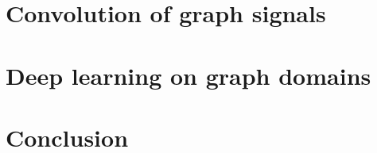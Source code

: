 \documentclass[12pt]{book}
\begin{document}
  \newpage
  \newpage
  \newpage

%
%

\setcounter{chapter}{1}
\chapter{Convolution of graph signals}\label{chap:2}
  \minitoc\newpage
  \newpage

\newpage
\newpage
\newpage
\newpage
\newpage

%
%
 \setcounter{chapter}{2}
 \chapter{Deep learning on graph domains}\label{chap:3}
  \minitoc\newpage
  \newpage


 \newpage
 \newpage
 \newpage
 \newpage

%
%


%
%

\chapter*{Conclusion}\label{chp:ccl}


%
%

\printbibliography[heading=bibintoc]

%
%

\end{document}
